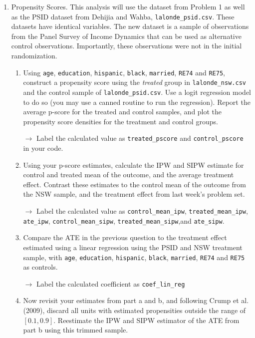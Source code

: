 \documentclass[11pt, a4paper]{article}
\begin{document}
\begin{enumerate}
\item Propensity Scores. This analysis will use the dataset
  from Problem 1 as well as the PSID dataset from Dehijia and
  Wahba, \texttt{lalonde\_psid.csv}. These datasets have identical
  variables. The new dataset is a sample of observations from the
  Panel Survey of Income Dynamics that can be used as alternative
  control observations. Importantly, these observations were not in
  the initial randomization.
  \begin{enumerate}
  \item Using \texttt{age}, \texttt{education}, \texttt{hispanic},
    \texttt{black}, \texttt{married},  \texttt{RE74}
    and \texttt{RE75}, construct a propensity score using the
    \emph{treated} group in \texttt{lalonde\_nsw.csv} and the control
    sample of \texttt{lalonde\_psid.csv}.  Use a logit regression
    model to do so (you may use a canned routine to run the
    regression). Report the average p-score for the treated and
    control samples, and plot the propensity score densities for the
    treatment and control groups.

    \hspace{10pt} $\rightarrow$ Label the calculated value as \texttt{treated\_pscore} and \texttt{control\_pscore} in your code.
  \item Using your p-score estimates, calculate the IPW and SIPW
    estimate for control and treated mean of the outcome, and the
    average treatment effect. Contrast these estimates to the control
    mean of the outcome from the NSW sample, and the treatment effect
    from last week's problem set.
   
    \hspace{10pt} $\rightarrow$ Label the calculated value as \texttt{control\_mean\_ipw}, \texttt{treated\_mean\_ipw}, \texttt{ate\_ipw},  \texttt{control\_mean\_sipw}, \texttt{treated\_mean\_sipw},and \texttt{ate\_sipw}.
  \item Compare the ATE in the previous question to the treatment
    effect estimated using a linear regression using the PSID and NSW
    treatment sample, with \texttt{age}, \texttt{education},
    \texttt{hispanic}, \texttt{black}, \texttt{married},
     \texttt{RE74} and \texttt{RE75} as controls.
   
    \hspace{10pt} $\rightarrow$ Label the calculated coefficient as \texttt{coef\_lin\_reg}
  \item Now revisit your estimates from part a and b, and following
    Crump et al. (2009), discard all units with estimated propensities
    outside the range of $[0.1, 0.9]$. Reestimate the IPW and SIPW
    estimator of the ATE from part b using this trimmed sample.
    

\end{enumerate}
\end{enumerate}
\end{document}
